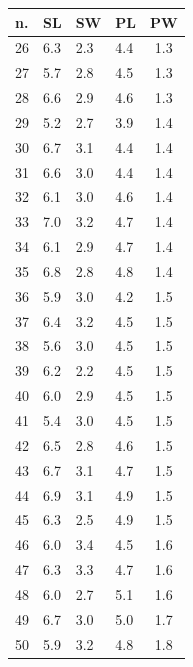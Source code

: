 \begin{table}[!ht]
\begin{tabular}{ |l|l|l|l|c| }
\hline
n. & SL & SW & PL & PW \\ \hline
\rowcolor[HTML]{EFEFEF} 
26 & 6.3 & 2.3 & 4.4 & 1.3 \\ \hline 
 \rowcolor[HTML]{EFEFEF} 
27 & 5.7 & 2.8 & 4.5 & 1.3 \\ \hline 
 \rowcolor[HTML]{EFEFEF} 
28 & 6.6 & 2.9 & 4.6 & 1.3 \\ \hline 
 \rowcolor[HTML]{EFEFEF} 
29 & 5.2 & 2.7 & 3.9 & 1.4 \\ \hline 
 \rowcolor[HTML]{EFEFEF} 
30 & 6.7 & 3.1 & 4.4 & 1.4 \\ \hline 
 \rowcolor[HTML]{EFEFEF} 
31 & 6.6 & 3.0 & 4.4 & 1.4 \\ \hline 
 \rowcolor[HTML]{EFEFEF} 
32 & 6.1 & 3.0 & 4.6 & 1.4 \\ \hline 
 \rowcolor[HTML]{EFEFEF} 
33 & 7.0 & 3.2 & 4.7 & 1.4 \\ \hline 
 \rowcolor[HTML]{EFEFEF} 
34 & 6.1 & 2.9 & 4.7 & 1.4 \\ \hline 
 \rowcolor[HTML]{EFEFEF} 
35 & 6.8 & 2.8 & 4.8 & 1.4 \\ \hline 
 \rowcolor[HTML]{EFEFEF} 
36 & 5.9 & 3.0 & 4.2 & 1.5 \\ \hline 
 \rowcolor[HTML]{EFEFEF} 
37 & 6.4 & 3.2 & 4.5 & 1.5 \\ \hline 
 \rowcolor[HTML]{EFEFEF} 
38 & 5.6 & 3.0 & 4.5 & 1.5 \\ \hline 
 \rowcolor[HTML]{EFEFEF} 
39 & 6.2 & 2.2 & 4.5 & 1.5 \\ \hline 
 \rowcolor[HTML]{EFEFEF} 
40 & 6.0 & 2.9 & 4.5 & 1.5 \\ \hline 
 \rowcolor[HTML]{EFEFEF} 
41 & 5.4 & 3.0 & 4.5 & 1.5 \\ \hline 
 \rowcolor[HTML]{EFEFEF} 
42 & 6.5 & 2.8 & 4.6 & 1.5 \\ \hline 
 \rowcolor[HTML]{EFEFEF} 
43 & 6.7 & 3.1 & 4.7 & 1.5 \\ \hline 
 \rowcolor[HTML]{EFEFEF} 
44 & 6.9 & 3.1 & 4.9 & 1.5 \\ \hline 
 \rowcolor[HTML]{EFEFEF} 
45 & 6.3 & 2.5 & 4.9 & 1.5 \\ \hline 
 \rowcolor[HTML]{EFEFEF} 
46 & 6.0 & 3.4 & 4.5 & 1.6 \\ \hline 
 \rowcolor[HTML]{EFEFEF} 
47 & 6.3 & 3.3 & 4.7 & 1.6 \\ \hline 
 \rowcolor[HTML]{EFEFEF} 
48 & 6.0 & 2.7 & 5.1 & 1.6 \\ \hline 
 \rowcolor[HTML]{EFEFEF} 
49 & 6.7 & 3.0 & 5.0 & 1.7 \\ \hline
50 & 5.9 & 3.2 & 4.8 & 1.8 \\ \hline
\end{tabular}
\end{table}

